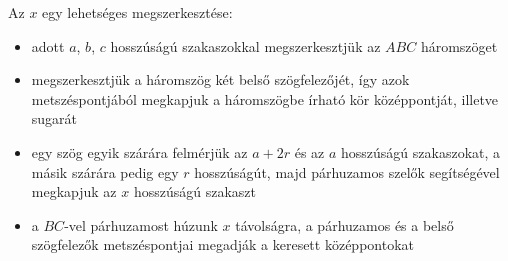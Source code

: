 \documentclass[a4paper,10pt]{article}
\begin{document}
Az $x$ egy lehetséges megszerkesztése:
\begin{itemize}
\item adott $a$, $b$, $c$ hosszúságú szakaszokkal megszerkesztjük az $ABC$ háromszöget
\item  megszerkesztjük a háromszög két belső szögfelezőjét, így azok metszéspontjából
megkapjuk a háromszögbe írható kör középpontját, illetve sugarát
\item  egy szög egyik szárára felmérjük az $a+2r$ és az $a$ hosszúságú szakaszokat, a másik
szárára pedig egy $r$ hosszúságút, majd párhuzamos szelők segítségével megkapjuk az
$x$ hosszúságú szakaszt
\item  a $BC$-vel párhuzamost húzunk $x$ távolságra, a párhuzamos és a belső szögfelezők
metszéspontjai megadják a keresett középpontokat

\end{itemize}
\end{document}
